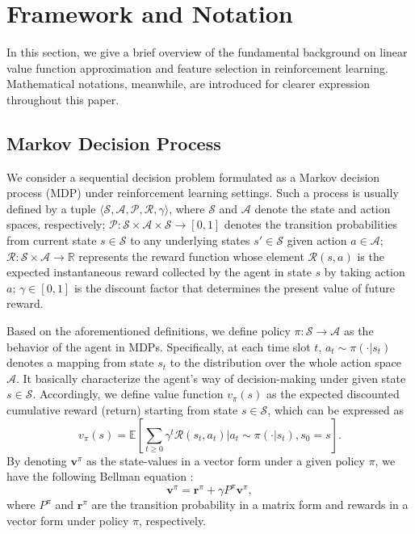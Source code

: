 \documentclass[onecolumn, conference]{IEEEtran}
\begin{document}
\section{Framework and Notation}\label{sec:framework}
In this section, we give a brief overview of the fundamental background on linear value function approximation and feature selection in reinforcement learning. Mathematical notations, meanwhile, are introduced for clearer expression throughout this paper. 
\subsection{Markov Decision Process} 
We consider a sequential decision problem formulated as a Markov decision process (MDP) under reinforcement learning settings. Such a process is usually defined by a tuple $\langle \mathcal{S},\mathcal{A},\mathcal{P}, \mathcal{R},\gamma\rangle$, where $\mathcal{S}$ and $\mathcal{A}$ denote the state and action spaces, respectively; $\mathcal{P}: \mathcal{S}\times\mathcal{A} \times \mathcal{S} \rightarrow [0,1] $ denotes the transition probabilities from current state $s\in \mathcal{S}$ to any underlying states $s'\in \mathcal{S}$ given action $a\in \mathcal{A}$; $\mathcal{R}: \mathcal{S}\times\mathcal{A}  \rightarrow \mathbb{R}$ represents the reward function whose element $\mathcal{R}(s,a)$ is the expected instantaneous reward collected by the agent in state $s$ by taking action $a$; $\gamma\in [0,1]$ is the discount factor that determines the present value of future reward.

Based on the aforementioned definitions, we define policy $\pi: \mathcal{S}\rightarrow \mathcal{A}$ as the behavior of the agent in MDPs. Specifically, at each time slot $t$, $a_t\sim \pi(\cdot|s_t)$ denotes a mapping from state $s_t$ to the distribution over the whole action space $\mathcal{A}$. It basically characterize the agent's way of decision-making under given state $s\in \mathcal{S}$. Accordingly, we define value function $v_\pi(s)$ as the expected discounted cumulative reward (return) starting from state $s\in\mathcal{S}$, which can be expressed as
	\begin{equation}
		v_\pi (s) = \mathbb{E}\left[\sum_{t\ge 0}\gamma^{t} \mathcal{R}(s_t,a_t)\Big| a_t \sim \pi(\cdot|s_t),s_0=s \right].
	\end{equation}
By denoting $\boldsymbol{v}^{\pi}$ as the state-values in a vector form under a given policy $\pi$, we have the following Bellman equation \cite{Puterman1994MarkovDP}:
	\begin{equation}\label{Bellman Equation}
		\boldsymbol{v}^\pi = \boldsymbol{r}^\pi +\gamma P^\pi \boldsymbol{v}^\pi,
	\end{equation}
	where $P^\pi$ and $\boldsymbol{r}^\pi$ are the transition probability in a matrix form and rewards in a vector form under policy $\pi$, respectively. 
\end{document}
